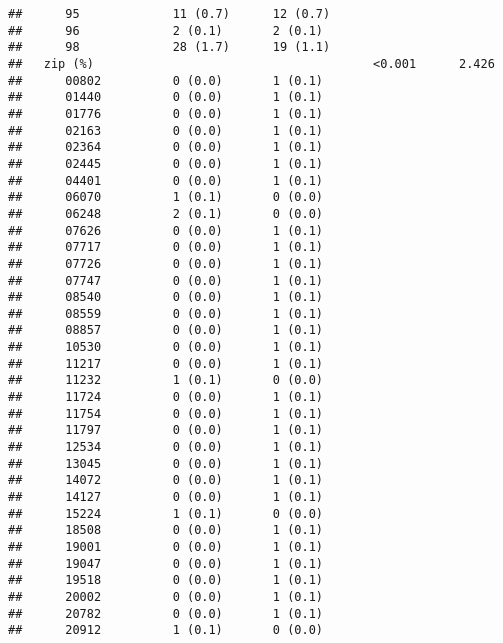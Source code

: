 \documentclass[]{article}
\begin{document}
\begin{verbatim}
##      95             11 (0.7)      12 (0.7)                       
##      96             2 (0.1)       2 (0.1)                        
##      98             28 (1.7)      19 (1.1)                       
##   zip (%)                                       <0.001      2.426
##      00802          0 (0.0)       1 (0.1)                        
##      01440          0 (0.0)       1 (0.1)                        
##      01776          0 (0.0)       1 (0.1)                        
##      02163          0 (0.0)       1 (0.1)                        
##      02364          0 (0.0)       1 (0.1)                        
##      02445          0 (0.0)       1 (0.1)                        
##      04401          0 (0.0)       1 (0.1)                        
##      06070          1 (0.1)       0 (0.0)                        
##      06248          2 (0.1)       0 (0.0)                        
##      07626          0 (0.0)       1 (0.1)                        
##      07717          0 (0.0)       1 (0.1)                        
##      07726          0 (0.0)       1 (0.1)                        
##      07747          0 (0.0)       1 (0.1)                        
##      08540          0 (0.0)       1 (0.1)                        
##      08559          0 (0.0)       1 (0.1)                        
##      08857          0 (0.0)       1 (0.1)                        
##      10530          0 (0.0)       1 (0.1)                        
##      11217          0 (0.0)       1 (0.1)                        
##      11232          1 (0.1)       0 (0.0)                        
##      11724          0 (0.0)       1 (0.1)                        
##      11754          0 (0.0)       1 (0.1)                        
##      11797          0 (0.0)       1 (0.1)                        
##      12534          0 (0.0)       1 (0.1)                        
##      13045          0 (0.0)       1 (0.1)                        
##      14072          0 (0.0)       1 (0.1)                        
##      14127          0 (0.0)       1 (0.1)                        
##      15224          1 (0.1)       0 (0.0)                        
##      18508          0 (0.0)       1 (0.1)                        
##      19001          0 (0.0)       1 (0.1)                        
##      19047          0 (0.0)       1 (0.1)                        
##      19518          0 (0.0)       1 (0.1)                        
##      20002          0 (0.0)       1 (0.1)                        
##      20782          0 (0.0)       1 (0.1)                        
##      20912          1 (0.1)       0 (0.0)                        

\end{verbatim}
\end{document}
